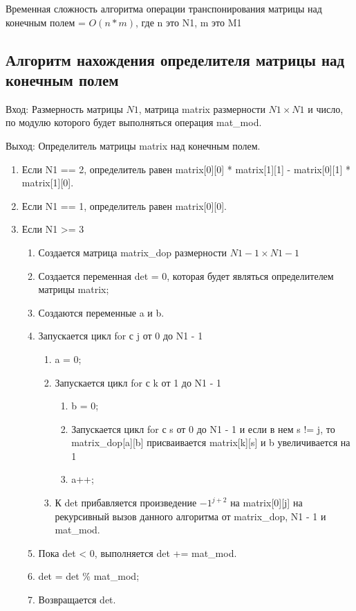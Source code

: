 \documentclass[bachelor, och, labwork]{shiza}
\begin{document}
	Временная сложность алгоритма операции транспонирования матрицы над конечным полем = $O(n * m)$, где n это N1, m это M1
	
	\subsection{Алгоритм нахождения определителя матрицы над конечным полем}

	$\textit{Вход:}$ Размерность матрицы $N1$, матрица matrix размерности $N1 \times N1$ и число, по модулю которого будет выполняться операция mat\_mod.
	
	$\textit{Выход:}$  Определитель матрицы matrix над конечным полем.	

		\begin{enumerate} 
			\item Если N1 == 2, определитель равен matrix[0][0] * matrix[1][1] - matrix[0][1] * matrix[1][0].
			\item Если N1 == 1, определитель равен matrix[0][0].
			\item Если N1 >= 3
			\begin{enumerate} 
				\item Создается матрица matrix\_dop размерности $N1 - 1 \times N1 - 1$
				\item Создается переменная det = 0, которая будет являться определителем матрицы matrix; 
				\item Создаются переменные a и b.
				\item Запускается цикл for с j от 0 до N1 - 1
				\begin{enumerate} 
					\item a = 0;
					\item Запускается цикл for с k от 1 до N1 - 1
							\begin{enumerate} 
								\item b = 0;
								\item Запускается цикл for с s от 0 до N1 - 1 и если в нем s != j, то matrix\_dop[a][b] присваивается matrix[k][s] и b увеличивается на 1
								\item a++;
							\end{enumerate}	
					\item К det прибавляется произведение $-1^{j + 2}$ на matrix[0][j] на рекурсивный вызов данного алгоритма от matrix\_dop, N1 - 1 и mat\_mod.
				\end{enumerate}
			\item Пока det < 0, выполняется det += mat\_mod.
			\item det = det \% mat\_mod;
			\item Возвращается det.
			\end{enumerate}
		\end{enumerate} 
		
\end{document}
